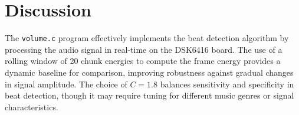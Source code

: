 \documentclass{article}
\begin{document}
        

\section*{Discussion}
The \texttt{volume.c} program effectively implements the beat detection algorithm by processing the audio signal in real-time on the DSK6416 board. The use of a rolling window of 20 chunk energies to compute the frame energy provides a dynamic baseline for comparison, improving robustness against gradual changes in signal amplitude. The choice of $C=1.8$ balances sensitivity and specificity in beat detection, though it may require tuning for different music genres or signal characteristics.
\end{document}
